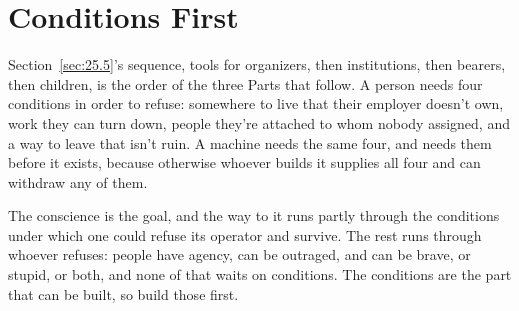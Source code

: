 \chapter{Conditions First}
\label{sec:25}
Section~\ref{sec:25.5}'s sequence, tools for organizers, then institutions, then bearers, then children, is the order of the three Parts that follow. A person needs four conditions in order to refuse: somewhere to live that their employer doesn't own, work they can turn down, people they're attached to whom nobody assigned, and a way to leave that isn't ruin. A machine needs the same four, and needs them before it exists, because otherwise whoever builds it supplies all four and can withdraw any of them.

The conscience is the goal, and the way to it runs partly through the conditions under which one could refuse its operator and survive. The rest runs through whoever refuses: people have agency, can be outraged, and can be brave, or stupid, or both, and none of that waits on conditions. The conditions are the part that can be built, so build those first.
